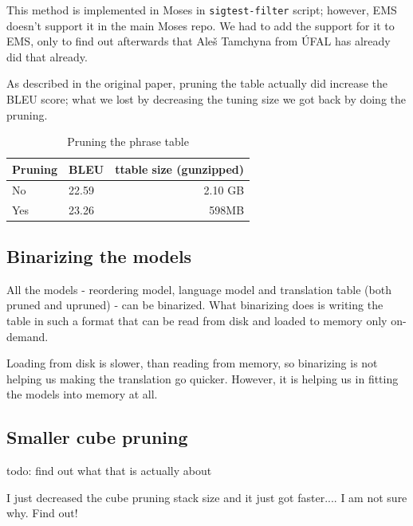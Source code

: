 This method is implemented in Moses in \texttt{sigtest-filter} script; however, EMS doesn't support it in the main Moses repo. We had to add the support for it to EMS, only to find out afterwards that Aleš Tamchyna from ÚFAL has already did that already.

As described in the original paper, pruning the table actually did increase the BLEU score; what we lost by decreasing the tuning size we got back by doing the pruning. 

\begin{table}[h]
\begin{center}
\begin{tabular}{|l|l|r|}
    \hline
    \textbf{Pruning} & \textbf{BLEU} & \textbf{ttable size (gunzipped)} \\ \hline
    No & 22.59 & 2.10 GB \\ \hline
    Yes & 23.26 & 598MB \\  \hline
\end{tabular}
\end{center}

\caption{Pruning the phrase table}\label{moses:tablepruning}
\end{table}

\subsection{Binarizing the models}
All the models - reordering model, language model and translation table (both pruned and upruned) - can be binarized. What binarizing does is writing the table in such a format that can be read from disk and loaded to memory only on-demand.

Loading from disk is slower, than reading from memory, so binarizing is not helping us making the translation go quicker. However, it is helping us in fitting the models into memory at all.


\subsection{Smaller cube pruning}
todo: find out what that is actually about

I just decreased the cube pruning stack size and it just got faster.... I am not sure why. Find out!